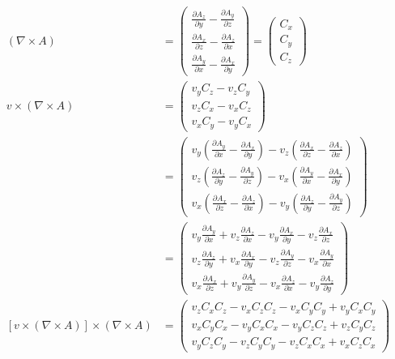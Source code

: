 \documentclass[smallextended]{svjour3}       %
\begin{document}
		
		 \begin{align}
    \left( \nabla \times A \right) & = \begin{pmatrix}
           \frac{\partial A_z}{\partial y} - \frac{\partial A_y}{\partial z} \\
           \frac{\partial A_x}{\partial z} - \frac{\partial A_z}{\partial x} \\
           \frac{\partial A_y}{\partial x} - \frac{\partial A_x}{\partial y}
         \end{pmatrix} = \begin{pmatrix}
           C_x \\
           C_y \\
           C_z
         \end{pmatrix}\\
				v \times \left( \nabla \times A \right) & = \begin{pmatrix}
           v_y C_z
					 - v_z C_y\\
					v_z C_x
					 - v_x C_z\\
					v_x C_y
					 - v_y C_x
         \end{pmatrix}\\ & = \begin{pmatrix}
           v_y \left(\frac{\partial A_y}{\partial x} - \frac{\partial A_x}{\partial y}\right)
					 - v_z \left(\frac{\partial A_x}{\partial z} - \frac{\partial A_z}{\partial x}\right)\\
					v_z \left(\frac{\partial A_z}{\partial y} - \frac{\partial A_y}{\partial z}\right)
					 - v_x \left(\frac{\partial A_y}{\partial x} - \frac{\partial A_x}{\partial y}\right)\\
					v_x \left(\frac{\partial A_x}{\partial z} - \frac{\partial A_z}{\partial x}\right)
					 - v_y \left(\frac{\partial A_z}{\partial y} - \frac{\partial A_y}{\partial z}\right)
         \end{pmatrix}\\& = \begin{pmatrix}
           v_y \frac{\partial A_y}{\partial x} + v_z \frac{\partial A_z}{\partial x}
					- v_y \frac{\partial A_x}{\partial y} - v_z \frac{\partial A_x}{\partial z}\\
					v_z \frac{\partial A_z}{\partial y} + v_x \frac{\partial A_x}{\partial y}
					- v_z \frac{\partial A_y}{\partial z} - v_x \frac{\partial A_y}{\partial x}\\
					v_x \frac{\partial A_x}{\partial z} + v_y \frac{\partial A_y}{\partial z}
					- v_x \frac{\partial A_z}{\partial x} - v_y \frac{\partial A_z}{\partial y}
         \end{pmatrix}\\
				\left[v \times \left( \nabla \times A \right)\right] \times \left( \nabla \times A \right) & = \begin{pmatrix}
           v_z C_x C_z - v_x C_z C_z - v_x C_y C_y + v_y C_x C_y\\
					 v_x C_y C_x - v_y C_x C_x - v_y C_z C_z + v_z C_y C_z\\
					 v_y C_z C_y - v_z C_y C_y - v_z C_x C_x + v_x C_z C_x
         \end{pmatrix}
   \end{align}
	
\end{document}
